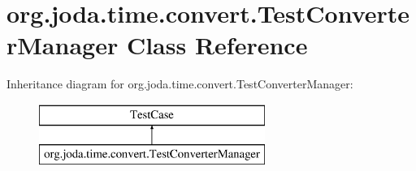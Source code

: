 \hypertarget{classorg_1_1joda_1_1time_1_1convert_1_1_test_converter_manager}{\section{org.\-joda.\-time.\-convert.\-Test\-Converter\-Manager Class Reference}
\label{classorg_1_1joda_1_1time_1_1convert_1_1_test_converter_manager}
}
Inheritance diagram for org.\-joda.\-time.\-convert.\-Test\-Converter\-Manager\-:\begin{figure}[H]
\begin{center}
\leavevmode
\includegraphics[height=2.000000cm]{classorg_1_1joda_1_1time_1_1convert_1_1_test_converter_manager}
\end{center}
\end{figure}
